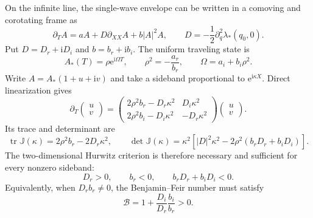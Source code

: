 \documentclass[11pt]{article}
\newcommand{\ii}{\mathrm{i}}
\newcommand{\ee}{\mathrm{e}}
\begin{document}
On the infinite line, the single-wave envelope can be written in a comoving
and corotating frame as
\begin{equation}
 \partial_TA=aA+D\partial_{XX}A+b|A|^2A,
 \qquad
 D=-\frac12\partial_q^2\lambda_*(q_0,0).
 \label{eq:single-wave-CGL}
\end{equation}
Put $D=D_r+\ii D_i$ and $b=b_r+\ii b_i$.  The uniform traveling state is
\begin{equation}
 A_*(T)=\rho\ee^{\ii\Omega T},
 \qquad
 \rho^2=-\frac{a_r}{b_r},
 \qquad
 \Omega=a_i+b_i\rho^2.
 \label{eq:single-wave-CGL-state}
\end{equation}
Write $A=A_*(1+u+\ii v)$ and take a sideband proportional to
$\ee^{\ii\kappa X}$.  Direct linearization gives
\begin{equation}
 \partial_T
 \begin{pmatrix}u\\v\end{pmatrix}
 =\begin{pmatrix}
 2\rho^2b_r-D_r\kappa^2&D_i\kappa^2\\
 2\rho^2b_i-D_i\kappa^2&-D_r\kappa^2
 \end{pmatrix}
 \begin{pmatrix}u\\v\end{pmatrix}.
 \label{eq:single-wave-sideband-matrix}
\end{equation}
Its trace and determinant are
\begin{equation}
 \operatorname{tr}\mathbb J(\kappa)
 =2\rho^2b_r-2D_r\kappa^2,
 \qquad
 \det\mathbb J(\kappa)
 =\kappa^2\left[|D|^2\kappa^2
 -2\rho^2(b_rD_r+b_iD_i)\right].
 \label{eq:single-wave-trace-determinant}
\end{equation}
The two-dimensional Hurwitz criterion is therefore necessary and sufficient
for every nonzero sideband:
\begin{equation}
 D_r>0,
 \qquad
 b_r<0,
 \qquad
 b_rD_r+b_iD_i<0.
 \label{eq:single-wave-BF-condition}
\end{equation}
Equivalently, when $D_rb_r\ne0$, the Benjamin--Feir number must satisfy
\begin{equation}
 \mathcal B=1+\frac{D_i}{D_r}\frac{b_i}{b_r}>0.
 \label{eq:Benjamin-Feir-number}
\end{equation}
\end{document}
